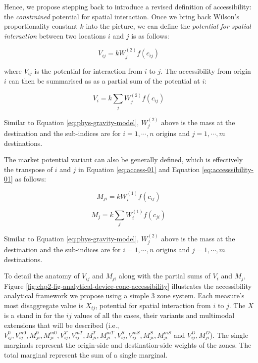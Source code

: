 \documentclass[
11pt, %
oneside, %
english, %
singlespacing, %
]{macthesis} %
\begin{document}
Hence, we propose stepping back to introduce a revised definition of accessibility: the \emph{constrained} potential for spatial interaction. Once we bring back Wilson's proportionality constant \(k\) into the picture, we can define the \emph{potential for spatial interaction} between two locations \(i\) and \(j\) is as follows:

\begin{equation}
\label{eq:access-01}
V_{ij} = k W_j^{(2)} f(c_{ij})
\end{equation} 

\noindent where \(V_{ij}\) is the potential for interaction from \(i\) to \(j\). The accessibility from origin \(i\) can then be summarised as as a partial sum of the potential at \(i\):

\begin{equation}
\label{eq:accesssibility-01}
V_{i} = k \sum_j W_j^{(2)} f(c_{ij})
\end{equation} 

Similar to Equation \ref{eq:phys-gravity-model}, \(W_j^{(2)}\) above is the mass at the destination and the sub-indices are for \(i = 1,\cdots, n\) origins and \(j = 1,\cdots, m\) destinations.

The market potential variant can also be generally defined, which is effectively the transpose of \(i\) and \(j\) in Equation \ref{eq:access-01} and Equation \ref{eq:accesssibility-01} as follows:

\begin{equation}
\label{eq:market-01}
M_{ji} = k W_i^{(1)} f(c_{ij})
\end{equation} 

\begin{equation}
\label{eq:market-potential-01}
M_{j} = k \sum_j W_i^{(1)} f(c_{ji})
\end{equation} 

Similar to Equation \ref{eq:phys-gravity-model}, \(W_j^{(2)}\) above is the mass at the destination and the sub-indices are for \(i = 1,\cdots, n\) origins and \(j = 1,\cdots, m\) destinations.

To detail the anatomy of \(V_{ij}\) and \(M_{ji}\) along with the partial sums of \(V_i\) and \(M_j\), Figure \ref{fig:chp2-fig-analytical-device-conc-accessibility} illustrates the accessibility analytical framework we propose using a simple 3 zone system. Each measure's most disaggregate value is \(X_{ij}\), potential for spatial interaction from \(i\) to \(j\). The \(X\) is a stand in for the \(ij\) values of all the cases, their variants and multimodal extensions that will be described (i.e., \(V_{ij}^0, V_{ij}^{m0}, M_{ji}^0, M_{ji}^{m0}, V_{ij}^T, V_{ij}^{mT}, M_{ji}^T, M_{ji}^{mT}, V_{ij}^S, V_{ij}^{mS}, M_{ji}^S, M_{ji}^{mS}\) and \(V_{ij}^D, M_{ji}^D\)). The single marginals represent the origin-side and destination-side weights of the zones. The total marginal represent the sum of a single marginal.
\end{document}
